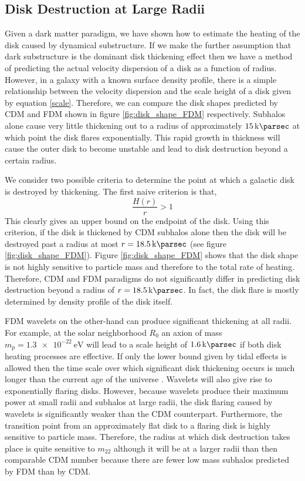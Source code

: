 \documentclass[usenatbib]{mnras}
\begin{document}
\subsection{Disk Destruction at Large Radii}

Given a dark matter paradigm, we have shown how to estimate the heating of the disk caused by dynamical substructure. If we make the further assumption that dark substructure is the dominant disk thickening effect then we have a method of predicting the actual velocity dispersion of a disk as a function of radius. However, in a galaxy with a known surface density   profile, there is a simple relationship between the velocity dispersion and the scale height of a disk given by equation \eqref{scale}. Therefore, we can compare the disk shapes predicted by CDM and FDM shown in figure \ref{fig:disk_shape_FDM} respectively. Subhalos alone cause very little thickening out to a radius of approximately $\SI{15}{\kilo \parsec}$ at which point the disk flares exponentially. This rapid growth in thickness will cause the outer disk to become unstable and lead to disk destruction beyond a certain radius. 
\par 
We consider two possible criteria to determine the point at which a galactic disk is destroyed by thickening. The first naive criterion is that, 
\begin{equation}
\frac{H(r)}{r} > 1
\end{equation}
This clearly gives an upper bound on the endpoint of the disk. Using this criterion, if the disk is thickened by CDM subhalos alone then the disk will be destroyed past a radius at most $r = \SI{18.5}{\kilo \parsec}$ (see figure \ref{fig:disk_shape_FDM}). Figure \ref{fig:disk_shape_FDM} shows that the disk shape is not highly sensitive to particle mass and therefore to the total rate of heating. Therefore, CDM and FDM paradigms do not significantly differ in predicting disk destruction beyond a radius of $r = \SI{18.5}{\kilo \parsec}$. In fact, the disk flare is mostly determined by density profile of the disk itself.  
\par
FDM wavelets on the other-hand can produce significant thickening at all radii. For example, at the solar neighborhood $R_0$ an axion of mass $m_p = \SI{1.3 e-22}{\electronvolt}$ will lead to a scale height of $\SI{1.6}{ \kilo\parsec}$ if both disk heating processes are effective. If only the lower bound given by tidal effects is allowed then the time scale over which significant disk thickening occurs is much longer than the current age of the universe \citep{ultralight}. Wavelets will also give rise to exponentially flaring disks. However, because wavelets produce their maximum power at small radii and subhalos at large radii, the disk flaring caused by wavelets is significantly weaker than the CDM counterpart. Furthermore, the transition point from an approximately flat disk to a flaring disk is highly sensitive to particle mass. Therefore, the radius at which disk destruction takes place is quite sensitive to $m_{22}$ although it will be at a larger radii than then comparable CDM number because there are fewer low mass subhalos predicted by FDM than by CDM. 
\end{document}
